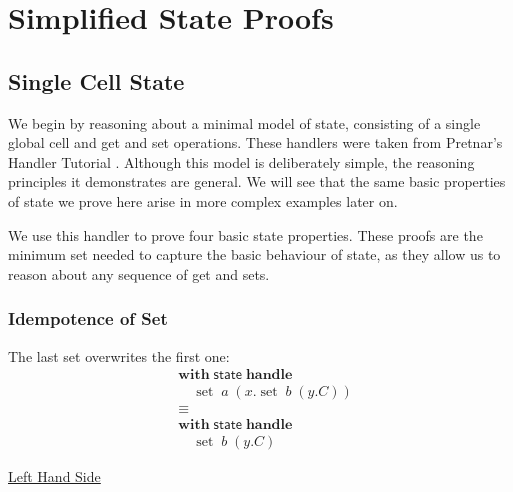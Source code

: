 \documentclass[logo,bsc,singlespacing,parskip]{infthesis}
\begin{document}
\section{Simplified State Proofs}
\subsection{Single Cell State}
\label{subsec:simplified-state}
We begin by reasoning about a minimal model of state, consisting of a single global cell and get and set operations. These handlers were taken from Pretnar's Handler Tutorial \cite{pretnar_introduction_2015}. Although this model is deliberately simple, the reasoning principles it demonstrates are general. We will see that the same basic properties of state we prove here arise in more complex examples later on.


We use this handler to prove four basic state properties. These proofs are the minimum set needed to capture the basic behaviour of state, as they allow us to reason about any sequence of get and sets.

\subsubsection*{Idempotence of Set}
The last set overwrites the first one:
\[
\begin{aligned}
    &\mathsf{\textbf{with}} \; \mathsf{state} \; \mathsf{\textbf{handle}} \\
    &\quad \operatorname{set} \; a \; (x. \operatorname{set} \; b \; (y. C)) \\
    &\equiv \\
    &\mathsf{\textbf{with}} \; \mathsf{state} \; \mathsf{\textbf{handle}} \\
    &\quad \operatorname{set} \; b \; (y. C)
\end{aligned}
\]

\underline{Left Hand Side}
\end{document}
